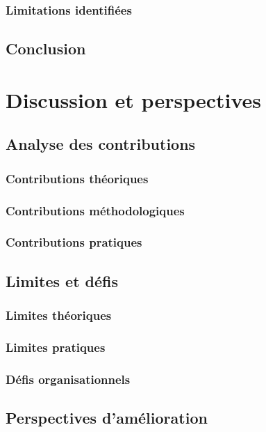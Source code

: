 \documentclass[a4paper,12pt]{article}
\begin{document}
\subsubsection{Limitations identifiées}
\label{sec:org44ec4fa}
\subsection{Conclusion}
\label{sec:org4300c60}
\clearpage
\section{Discussion et perspectives}
\label{sec:orga2625e2}
\subsection{Analyse des contributions}
\label{sec:org319f25e}
\subsubsection{Contributions théoriques}
\label{sec:orgadd8bfe}
\subsubsection{Contributions méthodologiques}
\label{sec:orgaa004c8}
\subsubsection{Contributions pratiques}
\label{sec:orge19e81b}
\subsection{Limites et défis}
\label{sec:org7fecc73}
\subsubsection{Limites théoriques}
\label{sec:org65b7858}
\subsubsection{Limites pratiques}
\label{sec:org8e4b8da}
\subsubsection{Défis organisationnels}
\label{sec:orgbc92458}
\subsection{Perspectives d'amélioration}
\label{sec:org7bebbd0}
\end{document}

